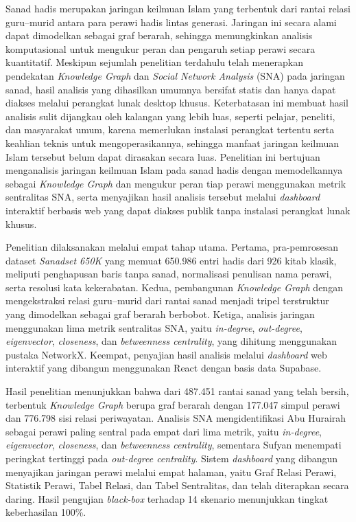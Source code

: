 Sanad hadis merupakan jaringan keilmuan Islam yang terbentuk dari rantai relasi guru--murid antara para perawi hadis lintas generasi. Jaringan ini secara alami dapat dimodelkan sebagai graf berarah, sehingga memungkinkan analisis komputasional untuk mengukur peran dan pengaruh setiap perawi secara kuantitatif. Meskipun sejumlah penelitian terdahulu telah menerapkan pendekatan \textit{Knowledge Graph} dan \textit{Social Network Analysis} (SNA) pada jaringan sanad, hasil analisis yang dihasilkan umumnya bersifat statis dan hanya dapat diakses melalui perangkat lunak desktop khusus. Keterbatasan ini membuat hasil analisis sulit dijangkau oleh kalangan yang lebih luas, seperti pelajar, peneliti, dan masyarakat umum, karena memerlukan instalasi perangkat tertentu serta keahlian teknis untuk mengoperasikannya, sehingga manfaat jaringan keilmuan Islam tersebut belum dapat dirasakan secara luas. Penelitian ini bertujuan menganalisis jaringan keilmuan Islam pada sanad hadis dengan memodelkannya sebagai \textit{Knowledge Graph} dan mengukur peran tiap perawi menggunakan metrik sentralitas SNA, serta menyajikan hasil analisis tersebut melalui \textit{dashboard} interaktif berbasis web yang dapat diakses publik tanpa instalasi perangkat lunak khusus.

Penelitian dilaksanakan melalui empat tahap utama. Pertama, pra-pemrosesan dataset \textit{Sanadset 650K} yang memuat 650.986 entri hadis dari 926 kitab klasik, meliputi penghapusan baris tanpa sanad, normalisasi penulisan nama perawi, serta resolusi kata kekerabatan. Kedua, pembangunan \textit{Knowledge Graph} dengan mengekstraksi relasi guru--murid dari rantai sanad menjadi tripel terstruktur yang dimodelkan sebagai graf berarah berbobot. Ketiga, analisis jaringan menggunakan lima metrik sentralitas SNA, yaitu \textit{in-degree}, \textit{out-degree}, \textit{eigenvector}, \textit{closeness}, dan \textit{betweenness centrality}, yang dihitung menggunakan pustaka NetworkX. Keempat, penyajian hasil analisis melalui \textit{dashboard} web interaktif yang dibangun menggunakan React dengan basis data Supabase.

Hasil penelitian menunjukkan bahwa dari 487.451 rantai sanad yang telah bersih, terbentuk \textit{Knowledge Graph} berupa graf berarah dengan 177.047 simpul perawi dan 776.798 sisi relasi periwayatan. Analisis SNA mengidentifikasi Abu Hurairah sebagai perawi paling sentral pada empat dari lima metrik, yaitu \textit{in-degree}, \textit{eigenvector}, \textit{closeness}, dan \textit{betweenness centrality}, sementara Sufyan menempati peringkat tertinggi pada \textit{out-degree centrality}. Sistem \textit{dashboard} yang dibangun menyajikan jaringan perawi melalui empat halaman, yaitu Graf Relasi Perawi, Statistik Perawi, Tabel Relasi, dan Tabel Sentralitas, dan telah diterapkan secara daring. Hasil pengujian \textit{black-box} terhadap 14 skenario menunjukkan tingkat keberhasilan 100\%.

